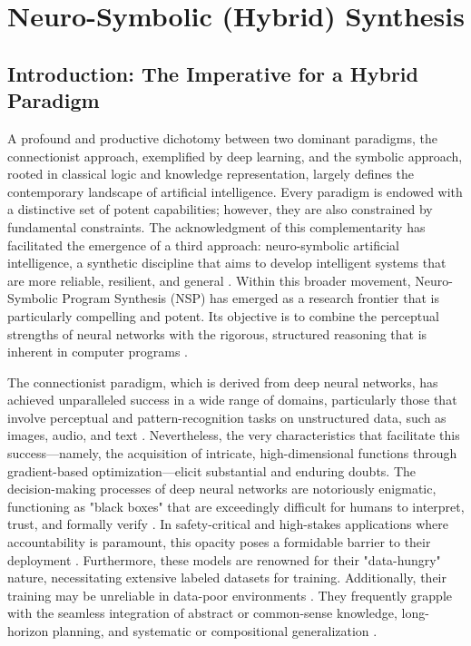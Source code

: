 \documentclass[12pt, a4paper]{report}
\begin{document}
\chapter{Neuro-Symbolic (Hybrid) Synthesis}
\label{chap:neuro-symbolic}

\section{Introduction: The Imperative for a Hybrid Paradigm}

A profound and productive dichotomy between two dominant paradigms, the connectionist approach, exemplified by deep learning, and the symbolic approach, rooted in classical logic and knowledge representation, largely defines the contemporary landscape of artificial intelligence. Every paradigm is endowed with a distinctive set of potent capabilities; however, they are also constrained by fundamental constraints. The acknowledgment of this complementarity has facilitated the emergence of a third approach: neuro-symbolic artificial intelligence, a synthetic discipline that aims to develop intelligent systems that are more reliable, resilient, and general \citep{chaudhuri2021neurosymbolic}.  Within this broader movement, Neuro-Symbolic Program Synthesis (NSP) has emerged as a research frontier that is particularly compelling and potent. Its objective is to combine the perceptual strengths of neural networks with the rigorous, structured reasoning that is inherent in computer programs \citep{lample2019deep}.

The connectionist paradigm, which is derived from deep neural networks, has achieved unparalleled success in a wide range of domains, particularly those that involve perceptual and pattern-recognition tasks on unstructured data, such as images, audio, and text \citep{chaudhuri2021neurosymbolic}. Nevertheless, the very characteristics that facilitate this success—namely, the acquisition of intricate, high-dimensional functions through gradient-based optimization—elicit substantial and enduring doubts. The decision-making processes of deep neural networks are notoriously enigmatic, functioning as "black boxes" that are exceedingly difficult for humans to interpret, trust, and formally verify \citep{calegari2020design}. In safety-critical and high-stakes applications where accountability is paramount, this opacity poses a formidable barrier to their deployment \citep{gulwani2017program}. Furthermore, these models are renowned for their "data-hungry" nature, necessitating extensive labeled datasets for training. Additionally, their training may be unreliable in data-poor environments \citep{gulwani2017program}. They frequently grapple with the seamless integration of abstract or common-sense knowledge, long-horizon planning, and systematic or compositional generalization \citep{evans2018learning}.
\end{document}
